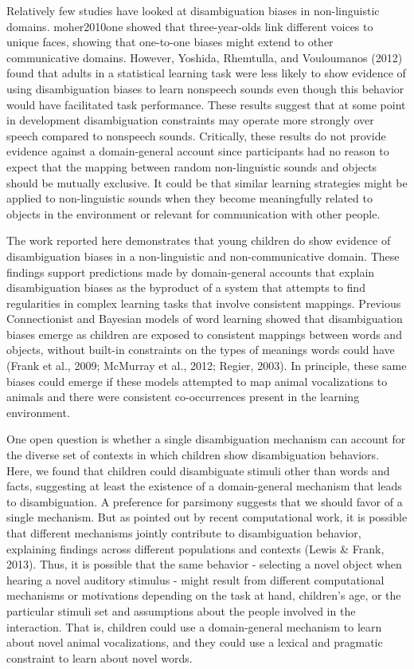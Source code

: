 \documentclass[english,floatsintext,man]{apa6}
\theoremstyle{definition}
\theoremstyle{definition}
\theoremstyle{definition}
\theoremstyle{remark}
\begin{document}
Relatively few studies have looked at disambiguation biases in
non-linguistic domains. moher2010one showed that three-year-olds link
different voices to unique faces, showing that one-to-one biases might
extend to other communicative domains. However, Yoshida, Rhemtulla, and
Vouloumanos (2012) found that adults in a statistical learning task were
less likely to show evidence of using disambiguation biases to learn
nonspeech sounds even though this behavior would have facilitated task
performance. These results suggest that at some point in development
disambiguation constraints may operate more strongly over speech
compared to nonspeech sounds. Critically, these results do not provide
evidence against a domain-general account since participants had no
reason to expect that the mapping between random non-linguistic sounds
and objects should be mutually exclusive. It could be that similar
learning strategies might be applied to non-linguistic sounds when they
become meaningfully related to objects in the environment or relevant
for communication with other people.

The work reported here demonstrates that young children do show evidence
of disambiguation biases in a non-linguistic and non-communicative
domain. These findings support predictions made by domain-general
accounts that explain disambiguation biases as the byproduct of a system
that attempts to find regularities in complex learning tasks that
involve consistent mappings. Previous Connectionist and Bayesian models
of word learning showed that disambiguation biases emerge as children
are exposed to consistent mappings between words and objects, without
built-in constraints on the types of meanings words could have (Frank et
al., 2009; McMurray et al., 2012; Regier, 2003). In principle, these
same biases could emerge if these models attempted to map animal
vocalizations to animals and there were consistent co-occurrences
present in the learning environment.

One open question is whether a single disambiguation mechanism can
account for the diverse set of contexts in which children show
disambiguation behaviors. Here, we found that children could
disambiguate stimuli other than words and facts, suggesting at least the
existence of a domain-general mechanism that leads to disambiguation. A
preference for parsimony suggests that we should favor of a single
mechanism. But as pointed out by recent computational work, it is
possible that different mechanisms jointly contribute to disambiguation
behavior, explaining findings across different populations and contexts
(Lewis \& Frank, 2013). Thus, it is possible that the same behavior -
selecting a novel object when hearing a novel auditory stimulus - might
result from different computational mechanisms or motivations depending
on the task at hand, children's age, or the particular stimuli set and
assumptions about the people involved in the interaction. That is,
children could use a domain-general mechanism to learn about novel
animal vocalizations, and they could use a lexical and pragmatic
constraint to learn about novel words.
\end{document}
